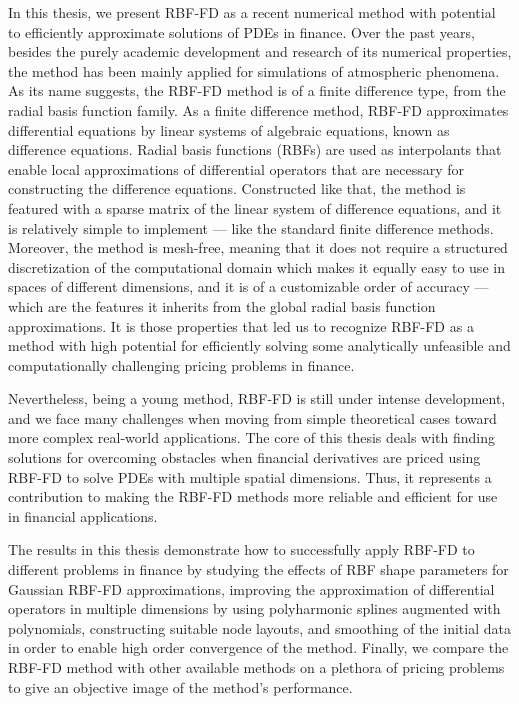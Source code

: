 \documentclass{UUThesisTemplate}
\begin{document}
{\par
In this thesis, we present RBF-FD as a recent numerical method with potential to efficiently approximate solutions of PDEs in finance. Over the past years, besides the purely academic development and research of its numerical properties, the method has been mainly applied for simulations of atmospheric phenomena. As its name suggests, the RBF-FD method is of a finite difference type, from the radial basis function family. As a finite difference method, RBF-FD approximates differential equations by linear systems of algebraic equations, known as difference equations. Radial basis functions (RBFs) are used as interpolants that enable local approximations of differential operators that are necessary for constructing the difference equations. Constructed like that, the method is featured with a sparse matrix of the linear system of difference equations, and it is relatively simple to implement --- like the standard finite difference methods. Moreover, the method is mesh-free, meaning that it does not require a structured discretization of the computational domain which makes it equally easy to use in spaces of different dimensions, and it is of a customizable order of accuracy --- which are the features it inherits from the global radial basis function approximations. It is those properties that led us to recognize RBF-FD as a method with high potential for efficiently solving some analytically unfeasible and computationally challenging pricing problems in finance.

\par
Nevertheless, being a young method, RBF-FD is still under intense development, and we face many challenges when moving from simple theoretical cases toward more complex real-world applications. The core of this thesis deals with finding solutions for overcoming obstacles when financial derivatives are priced using RBF-FD to solve PDEs with multiple spatial dimensions. Thus, it represents a contribution to making the RBF-FD methods more reliable and efficient for use in financial applications. 

\par
The results in this thesis demonstrate how to successfully apply RBF-FD to different problems in finance by studying the effects of RBF shape parameters for Gaussian RBF-FD approximations, improving the approximation of differential operators in multiple dimensions by using polyharmonic splines augmented with polynomials, constructing suitable node layouts, and smoothing of the initial data in order to enable high order convergence of the method. Finally, we compare the RBF-FD method with other available methods on a plethora of pricing problems to give an objective image of the method's performance.
}
\end{document}
